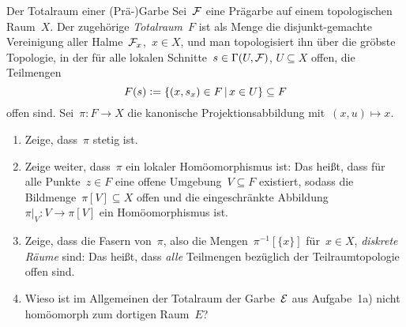 \documentclass{uebblatt}
\begin{document}
\begin{aufgabe}{Der Totalraum einer (Prä-)Garbe}
Sei~$\mathcal{F}$ eine Prägarbe auf einem topologischen Raum~$X$. Der zugehörige
\emph{Totalraum}~$F$ ist als Menge die disjunkt-gemachte Vereinigung aller
Halme~$\mathcal{F}_x$,~$x \in X$, und man topologisiert ihn über die gröbste Topologie, in
der für alle lokalen Schnitte~$s \in \Gamma(U,\mathcal{F})$, $U \subseteq X$ offen, die
Teilmengen
\[ F(s) \vcentcolon= \{ (x, s_x) \in F \,|\, x \in U \} \subseteq F \]
offen sind. Sei~$\pi : F \to X$ die kanonische Projektionsabbildung
mit~$(x,u) \mapsto x$.

\begin{enumerate}
\item Zeige, dass~$\pi$ stetig ist.
\item Zeige weiter, dass~$\pi$ ein lokaler Homöomorphismus ist: Das heißt, dass
für alle Punkte~$z \in F$ eine offene Umgebung~$V \subseteq F$ existiert,
sodass die Bildmenge~$\pi[V] \subseteq X$ offen und die eingeschränkte
Abbildung~$\pi|_V : V \to \pi[V]$ ein Homöomorphismus ist.
\item Zeige, dass die Fasern von~$\pi$, also die Mengen~$\pi^{-1}[\{x\}]$
für~$x \in X$, \emph{diskrete Räume} sind: Das heißt, dass \emph{alle}
Teilmengen bezüglich der Teilraumtopologie offen sind.
\item Wieso ist im Allgemeinen der Totalraum der Garbe~$\mathcal{E}$ aus Aufgabe~1a)
nicht homöomorph zum dortigen Raum~$E$?
\end{enumerate}
\end{aufgabe}

\newpage
\end{document}
